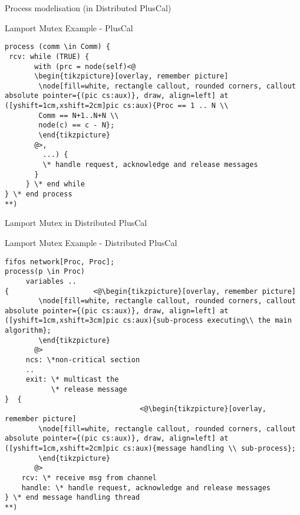 \documentclass{beamer}
\begin{document}
\begin{frame}[fragile]{Process modelisation (in Distributed PlusCal)}
\begin{exampleblock}{Lamport Mutex Example - PlusCal}
        \begin{lstlisting}[language=pluscal, frame = none, numbers = none]
process (comm \in Comm) {
 rcv: while (TRUE) {
       with (prc = node(self)<@
       \begin{tikzpicture}[overlay, remember picture]
        \node[fill=white, rectangle callout, rounded corners, callout absolute pointer={(pic cs:aux)}, draw, align=left] at ([yshift=1cm,xshift=2cm]pic cs:aux){Proc == 1 .. N \\
        Comm == N+1..N+N \\
        node(c) == c - N};
        \end{tikzpicture}
       @>,
         ...) {
         \* handle request, acknowledge and release messages
       }
     } \* end while
} \* end process
**)
\end{lstlisting}
\end{exampleblock}
\end{frame}


\begin{frame}[fragile]{Lamport Mutex in Distributed PlusCal}
\begin{exampleblock}{Lamport Mutex Example - Distributed PlusCal}
\begin{lstlisting}[language=pluscal, frame = none, numbers = none]
fifos network[Proc, Proc];
process(p \in Proc)
     variables ..
{                    <@\begin{tikzpicture}[overlay, remember picture]
        \node[fill=white, rectangle callout, rounded corners, callout absolute pointer={(pic cs:aux)}, draw, align=left] at ([yshift=1cm,xshift=3cm]pic cs:aux){sub-process executing\\ the main algorithm};
        \end{tikzpicture}
       @>
     ncs: \*non-critical section
     .. 
     exit: \* multicast the
           \* release message 
}  {
                                <@\begin{tikzpicture}[overlay, remember picture]
        \node[fill=white, rectangle callout, rounded corners, callout absolute pointer={(pic cs:aux)}, draw, align=left] at ([yshift=1cm,xshift=2cm]pic cs:aux){message handling \\ sub-process};
        \end{tikzpicture}
       @>
    rcv: \* receive msg from channel
    handle: \* handle request, acknowledge and release messages
} \* end message handling thread
**)
\end{lstlisting}
\end{exampleblock}
\end{frame}
\end{document}

